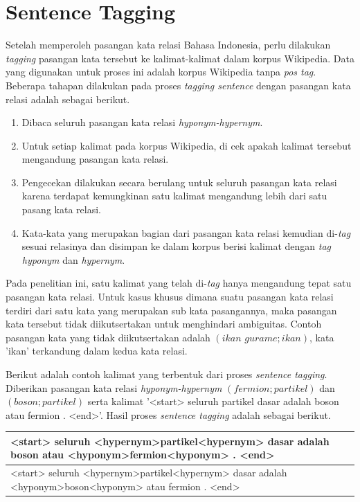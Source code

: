 \section{Sentence Tagging}
Setelah memperoleh pasangan kata relasi Bahasa Indonesia, perlu dilakukan \textit{tagging} pasangan kata tersebut ke kalimat-kalimat dalam korpus Wikipedia. Data yang digunakan untuk proses ini adalah korpus Wikipedia tanpa \textit{pos tag}. Beberapa tahapan dilakukan pada proses \textit{tagging sentence} dengan pasangan kata relasi adalah sebagai berikut.
\begin{enumerate}
  \item Dibaca seluruh pasangan kata relasi \textit{hyponym-hypernym}.
  \item Untuk setiap kalimat pada korpus Wikipedia, di cek apakah kalimat tersebut mengandung pasangan kata relasi.
  \item Pengecekan dilakukan secara berulang untuk seluruh pasangan kata relasi karena terdapat kemungkinan satu kalimat mengandung lebih dari satu pasang kata relasi.
  \item Kata-kata yang merupakan bagian dari pasangan kata relasi kemudian di-\textit{tag} sesuai relasinya dan disimpan ke dalam korpus berisi kalimat dengan \textit{tag} \textit{hyponym} dan \textit{hypernym}.
\end{enumerate}
Pada penelitian ini, satu kalimat yang telah di-\textit{tag} hanya mengandung tepat satu pasangan kata relasi. Untuk kasus khusus dimana suatu pasangan kata relasi terdiri dari satu kata yang merupakan sub kata pasangannya, maka pasangan kata tersebut tidak diikutsertakan untuk menghindari ambiguitas. Contoh pasangan kata yang tidak diikutsertakan adalah $(ikan\,\,gurame;ikan)$, kata 'ikan' terkandung dalam kedua kata relasi. 

Berikut adalah contoh kalimat yang terbentuk dari proses \textit{sentence tagging}. Diberikan pasangan kata relasi \textit{hyponym-hypernym} $(fermion;partikel)$ dan $(boson;partikel)$ serta kalimat  '<start> seluruh partikel dasar adalah boson atau fermion . <end>'. Hasil proses \textit{sentence tagging} adalah sebagai berikut.
\begin{center}
\begin{tabular}{ | m{32em} | } 
\hline
<start> seluruh <hypernym>partikel<hypernym> dasar adalah boson atau <hyponym>fermion<hyponym> . <end> \\ 
\hline
<start> seluruh <hypernym>partikel<hypernym> dasar adalah <hyponym>boson<hyponym> atau fermion . <end> \\ 
\hline
\end{tabular}
\end{center}

